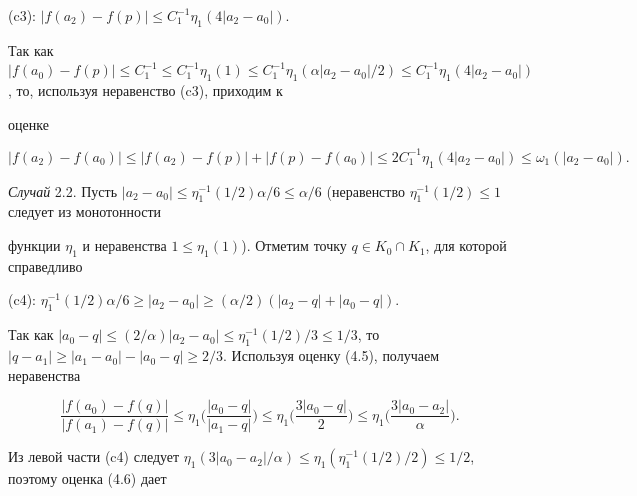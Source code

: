 \begin{pf}
(c3): $|f(a_2)-f(p)|\leq C_1^{-1}\eta_1(4|a_2-a_0|)$.





\noindent{}Так как $|f(a_0)-f(p)| \leq C_1^{-1} 


\leq C_1^{-1}\eta_1(1) \leq C_1^{-1}\eta_1(\alpha|a_2-a_0|/2) \leq 


C_1^{-1}\eta_1(4|a_2-a_0|)$, то, используя неравенство (c3), приходим к 


оценке


$$


|f(a_2)-f(a_0)| \leq |f(a_2)-f(p)|+|f(p)-f(a_0)| \leq 


2C_1^{-1}\eta_1(4|a_2-a_0|) \leq \omega_1(|a_2-a_0|).


$$





{\it Случай} 2.2. Пусть $|a_2-a_0| \leq \eta_1^{-1}(1/2)\alpha/6 


\leq \alpha/6$ (неравенство $\eta_1^{-1}(1/2) \leq 1$ следует из монотонности 


функции $\eta_1$ и неравенства $1 \leq \eta_1(1)$). Отметим точку $q\in 


K_0\cap K_1$, для которой справедливо





(c4): $\eta_1^{-1}(1/2) \alpha/6 \geq |a_2-a_0| 


\geq (\alpha/2)(|a_2-q|+|a_0-q|)$.





\noindent{}Так как $|a_0-q| \leq (2/\alpha)|a_2-a_0| \leq 


\eta_1^{-1}(1/2)/3 \leq 1/3$, то $|q-a_1| \geq |a_1-a_0|-|a_0-q| \geq 


2/3$. Используя оценку (4.5), получаем неравенства


\begin{equation}


\frac{|f(a_0)-f(q)|}{|f(a_1)-f(q)|} \leq \eta_1\bigg( \frac{|a_0-q|}


{|a_1-q|} \bigg) \leq \eta_1\bigg( \frac{3|a_0-q|}{2} \bigg) \leq 


\eta_1\bigg( \frac{3|a_0-a_2|}{\alpha} \bigg). 


\end{equation}


Из левой части (c4) следует $\eta_1(3|a_0-a_2|/\alpha) 


\leq \eta_1(\eta_1^{-1}(1/2)/2) \leq 1/2$, поэтому оценка (4.6) дает 



\end{pf}
